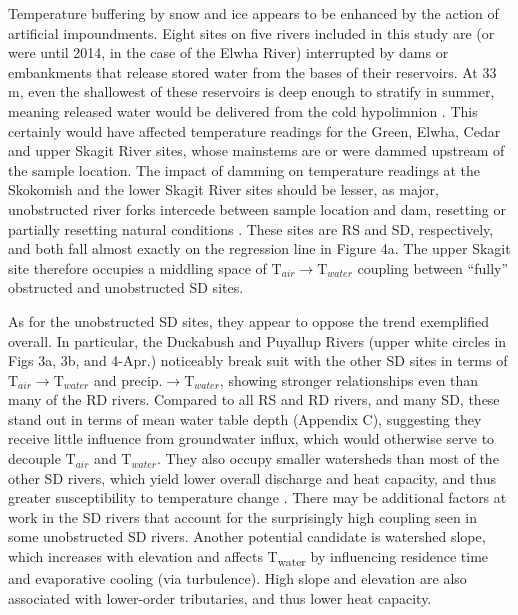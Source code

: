 \documentclass[notitlepage]{article}
\begin{document}
Temperature buffering by snow and ice appears to be enhanced by the action of artificial impoundments. Eight sites on five rivers included in this study are (or were until 2014, in the case of the Elwha River) interrupted by dams or embankments that release stored water from the bases of their reservoirs. At 33 m, even the shallowest of these reservoirs is deep enough to stratify in summer, meaning released water would be delivered from the cold hypolimnion \citep{olden_hypoCold}. This certainly would have affected temperature readings for the Green, Elwha, Cedar and upper Skagit River sites, whose mainstems are or were dammed upstream of the sample location. The impact of damming on temperature readings at the Skokomish and the lower Skagit River sites should be lesser, as major, unobstructed river forks intercede between sample location and dam, resetting or partially resetting natural conditions \citep{stanford2001revisiting}. These sites are RS and SD, respectively, and both fall almost exactly on the regression line in Figure 4a. The upper Skagit site therefore occupies a middling space of $\textrm{T}_{air}\rightarrow \textrm{T}_{water}$ coupling between ``fully'' obstructed and unobstructed SD sites.

As for the unobstructed SD sites, they appear to oppose the trend exemplified overall. In particular, the Duckabush and Puyallup Rivers (upper white circles in Figs 3a, 3b, and 4-Apr.) noticeably break suit with the other SD sites in terms of $\textrm{T}_{air}\rightarrow \textrm{T}_{water}$ and $\textrm{precip.}\rightarrow \textrm{T}_{water}$, showing stronger relationships even than many of the RD rivers. Compared to all RS and RD rivers, and many SD, these stand out in terms of mean water table depth (Appendix C), suggesting they receive little influence from groundwater influx, which would otherwise serve to decouple $\textrm{T}_{air}$ and $\textrm{T}_{water}$. They also occupy smaller watersheds than most of the other SD rivers, which yield lower overall discharge and heat capacity, and thus greater susceptibility to temperature change \citep{caissie2006thermal}. There may be additional factors at work in the SD rivers that account for the surprisingly high coupling seen in some unobstructed SD rivers. Another potential candidate is watershed slope, which increases with elevation and affects T\textsubscript{water} by influencing residence time and evaporative cooling (via turbulence). High slope and elevation are also associated with lower-order tributaries, and thus lower heat capacity. 
\end{document}
